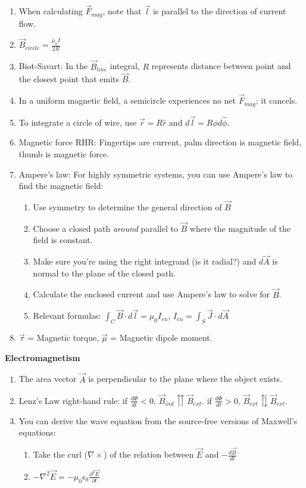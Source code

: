 \documentclass[8pt]{article}
\begin{document}
\begin{enumerate}
    \item When calculating $\vec{F}_{mag}$, note that $\vec{l}$ is parallel to the direction of current flow.
    \item $\vec{B}_{circle} = \frac{\mu_0 I}{2R}$
    \item Biot-Savart: In the $\vec{B}_{line}$ integral, $R$ represents distance between point and the closest point that emits ${\vec{B}}$.
    \item In a uniform magnetic field, a semicircle experiences no net $\vec{F}_{mag}$; it cancels.
    \item To integrate a circle of wire, use $\vec{r} = R \hat{r}$ and $d\vec{l} = R \phi d\hat{\phi}$.
    \item Magnetic force RHR: Fingertips are current, palm direction is magnetic field, thumb is magnetic force.
    \item Ampere's law: For highly symmetric systems, you can use Ampere's law to find the magnetic field:
    \begin{enumerate}
        \item Use symmetry to determine the general direction of $\vec{B}$
        \item Choose a closed path \textit{around} parallel to $\vec{B}$ where the magnitude of the field is constant.
        \item Make sure you're using the right integrand (is it radial?) and $d\vec{A}$ is normal to the plane of the closed path.
        \item Calculate the enclosed current and use Ampere's law to solve for $\vec{B}$.
        \item Relevant formulas: $\int_C \vec{B} \cdot d\vec{l} = \mu_0 I_{en}$, $I_{en} = \int_S \vec{J} \cdot d\vec{A}$
    \end{enumerate}
    \item $\vec{\tau}$ = Magnetic torque, $\vec{\mu}$ = Magnetic dipole moment.
\end{enumerate}
\textbf{Electromagnetism}
\begin{enumerate}
    \item The area vector $\vec{A}$ is perpendicular to the plane where the object exists.
    \item Lenz's Law right-hand rule: if $\frac{d \Phi}{dt} < 0$, $\vec{B}_{ind} \upuparrows \vec{B}_{ext}$. if $\frac{d \Phi}{dt} > 0$, $\vec{B}_{ext} \updownarrows \vec{B}_{ext}$.
    \item You can derive the wave equation from the source-free versions of Maxwell's equations:
    \begin{enumerate}
        \item Take the curl ($\nabla \times$) of the relation between $\vec{E}$ and $-\frac{d\vec{B}}{dt}$
        \item $-\nabla^2 \vec{E} = -\mu_0 \epsilon_0 \frac{\partial^2 \vec{E}}{\partial t}$
    \end{enumerate}
\end{enumerate}
\end{document}
